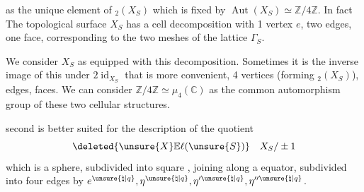 
as the unique element of \({}_2(X_S)\) which is fixed by $\operatorname{Aut}(X_S)\simeq\mathbb Z/4\mathbb Z$. In fact
\inserted{\[
(X_S)^{i}\overset{\mathrm{def}}{=}\{x\in X_S\deleted{\}} \mid ix=x\}=\{e,\eta_S\}
\]}
 The topological surface $X_S$ has a  cell decomposition with 1 vertex $e$, two edges, one face,  corresponding to the two meshes of the lattice $\Gamma_S$.

We consider $X_S$ as equipped with this decomposition. Sometimes it is the inverse image of this under $2\operatorname{id}_{X_S}$ that is more convenient, 4 vertices (forming \({}_2(X_S)\)),   edges,   faces. We can consider $\mathbb Z/4\mathbb Z\simeq\mu_4(\mathbb C)$ as the common automorphism group of these two cellular structures.


 second is better suited for the description of the quotient
\[
\deleted{\unsure{X}\mathbb E\ell(\unsure{S})}\quad X_S/\pm1
\]
which is a sphere, subdivided into  square , joining along a  equator, subdivided into four edges by $e^{\unsure{\natural|q}},\eta^{\unsure{\natural|q}},\eta'^{\unsure{\natural|q}},\eta''^{\unsure{\natural|q}}$.

